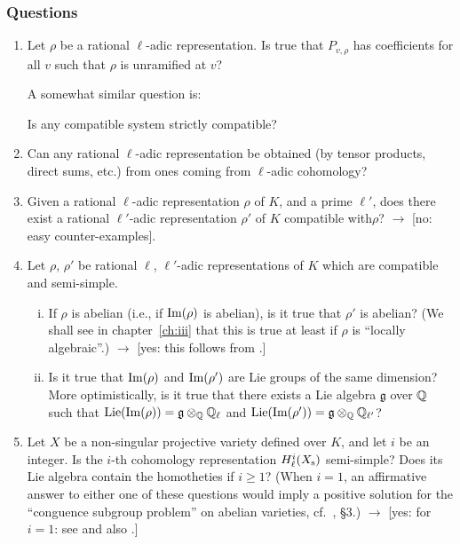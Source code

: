 \subsubsection*{Questions}
\begin{enumerate}
\item Let $\rho$ be a rational $\ell$-adic representation. Is true that
$P_{v,\rho}$ has coefficients for all $v$ such that $\rho$ is unramified
at $v$?

A somewhat similar question is:
\begin{displayquote}
	Is any compatible system strictly compatible?
\end{displayquote}

\item Can any rational $\ell$-adic representation be obtained (by tensor
	products, direct sums, etc.) from ones coming from $\ell$-adic
	cohomology?
\item Given a rational $\ell$-adic representation $\rho$ of $K$, and a prime
	$\ell'$, does there exist a rational $\ell'$-adic representation $\rho'$
	of $K$ compatible with\break $\rho$? $\rightarrow$ [no: easy
	counter-examples].
\item Let $\rho$, $\rho'$ be rational $\ell$, $\ell'$-adic representations of
	$K$ which are compatible and semi-simple.
\begin{enumerate}[(i)]
\item If $\rho$ is abelian (i.e., if $\operatorname{Im}(\rho)$ is abelian), is it
	true that $\rho'$ is abelian? (We shall see in
	chapter~\ref{ch:iii} that this is true at least if $\rho$ is
	``locally algebraic''.) $\rightarrow$ [yes: this follows from
	\cite{36}.]
\item Is it true that $\operatorname{Im}(\rho)$ and $\operatorname{Im}(\rho')$ are Lie groups of the
\dpage		
	same dimension? More optimistically, is it true that there exists a Lie
	algebra $\mathfrak{g}$ over $\mathbb{Q}$ such that $\operatorname{Lie}(\operatorname{Im}(\rho)) =
	\mathfrak{g} \otimes_{\mathbb{Q}} \mathbb{Q}_{\ell}$ and $\operatorname{Lie}(\operatorname{Im}(\rho')) = \mathfrak{g}
	\otimes_{\mathbb{Q}} \mathbb{Q}_{\ell'}$?
\end{enumerate}
\item Let $X$ be a non-singular projective variety defined over $K$, and
let $i$ be an integer. Is the $i$-th cohomology representation
$H_\ell^i(X_{\mathrm{s}})$ semi-simple?
Does its Lie algebra contain the homotheties if $i\geq1$? (When $i=1$, an
affirmative answer to either one of these questions would imply a positive
solution for the ``conguence subgroup problem'' on abelian varieties, cf.\
\cite{24}, \S3.) $\rightarrow$ [yes: for $i=1$: see \cite{48} and also
\cite{75}.]
\end{enumerate}

